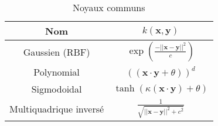 \begin{table}[H]
	\centering
\begin{tabular}{|c|c|}
	\hline
	         Nom           &                  $k(\textbf{x}, \textbf{y})$                  \\ \hline
	    Gaussien (RBF)     & $\exp \left(\frac{-|| \textbf{x} - \textbf{y}||^2}{c}\right)$ \\ \hline
	      Polynomial       &         $((\textbf{x} \cdot \textbf{y} + \theta))^d$          \\ \hline
	     Sigmodoidal       &    $\tanh (\kappa (\textbf{x} \cdot \textbf{y}) + \theta)$    \\ \hline
	Multiquadrique inversé &     $\frac{1}{\sqrt{||\textbf{x}-\textbf{y}||^2 + c^2}}$      \\ \hline
\end{tabular} 
\caption{Noyaux communs}
\label{tab:kernels}
\end{table}
